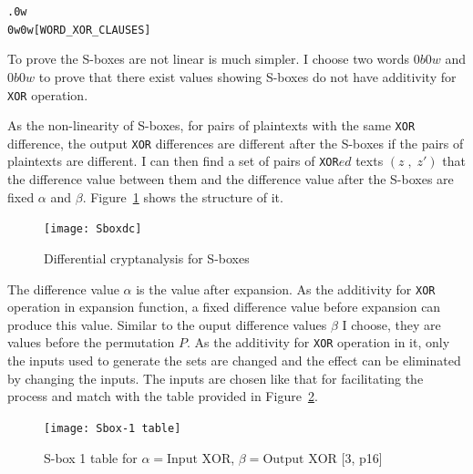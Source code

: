 \documentclass{article}
\begin{document}
\begin{alltt}
  \HOLTokenTurnstile{} \HOLSymConst{\HOLTokenForall{}}.  \HOLSymConst{\HOLTokenEor{}}  \HOLSymConst{=} \HOLSymConst{\HOLTokenNeg{}} \HOLSymConst{\HOLTokenConj{}}  \HOLSymConst{\HOLTokenEor{}}  \HOLSymConst{=} \HOLSymConst{\HOLTokenNeg{}} \HOLSymConst{\HOLTokenConj{}} 0w \HOLSymConst{\HOLTokenEor{}}  \HOLSymConst{=}  \HOLSymConst{\HOLTokenConj{}}
        \HOLSymConst{\HOLTokenEor{}} 0w \HOLSymConst{=}  \HOLSymConst{\HOLTokenConj{}}  \HOLSymConst{\HOLTokenEor{}}  \HOLSymConst{=} 0w\hfill{[WORD_XOR_CLAUSES]}
\end{alltt}

To prove the S-boxes are not linear is much simpler. I choose two words $0b0w$ and $0b0w$ to prove that there exist values
showing S-boxes do not have additivity for \verb|XOR| operation.

As the non-linearity of S-boxes, for pairs of plaintexts with the same \verb|XOR| difference, the output \verb|XOR| differences are
different after the S-boxes if the pairs of plaintexts are different. I can then find a set of pairs of \verb|XOR|$ed$ texts
$(z\;, \;z')$ that
the difference value between them and the difference value after the S-boxes are fixed $\alpha$ and $\beta$. Figure~\ref{fig:form6}
shows the structure of it.

\begin{figure}
\centering
\texttt{[image: Sboxdc]}
\caption{\label{fig:form6} Differential cryptanalysis for S-boxes}
\end{figure}

The difference value $\alpha$ is the value after expansion. As the additivity for \verb|XOR| operation in expansion function,
a fixed difference value before expansion can produce this value. Similar to the ouput difference values $\beta$ I
choose, they are values before the permutation $P$. As the additivity for \verb|XOR| operation in it, only the inputs used to
generate the sets are changed and the effect can be eliminated by changing the inputs. The inputs are chosen like that
for facilitating the process and match with the table provided in Figure~\ref{fig:form5}.

\begin{figure}
\centering
\texttt{[image: Sbox-1 table]}
\caption{\label{fig:form5} S-box 1 table for $\alpha = \text{Input XOR}$, $\beta = \text{Output XOR}$ [3, p16]}
\end{figure}
\end{document}
